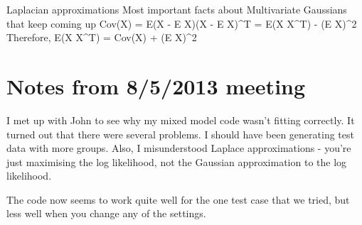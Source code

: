 \documentclass{amsart}
\begin{document}
Laplacian approximations
Most important facts about Multivariate Gaussians that keep coming up
Cov(X) = E(X - E X)(X - E X)^T = E(X X^T) - (E X)^2
Therefore, E(X X^T) = Cov(X) + (E X)^2

\section{Notes from 8/5/2013 meeting}
I met up with John to see why my mixed model code wasn't fitting correctly.
It turned out that there were several problems. I should have been generating
test data with more groups. Also, I misunderstood Laplace approximations -
you're just maximising the log likelihood, not the Gaussian approximation to
the log likelihood.

The code now seems to work quite well for the one test case that we tried,
but less well when you change any of the settings.
\end{document}

